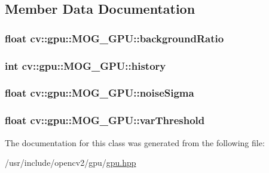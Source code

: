 \subsection{Member Data Documentation}
\hypertarget{classcv_1_1gpu_1_1MOG__GPU_ab19166eef3431fed0abb108a3718db19}{
\subsubsection[{background\-Ratio}]{\setlength{\rightskip}{0pt plus 5cm}float cv\-::gpu\-::\-M\-O\-G\-\_\-\-G\-P\-U\-::background\-Ratio}}\label{classcv_1_1gpu_1_1MOG__GPU_ab19166eef3431fed0abb108a3718db19}
\hypertarget{classcv_1_1gpu_1_1MOG__GPU_a73ca55f7883c8411201ff0230d9aa6fb}{
\subsubsection[{history}]{\setlength{\rightskip}{0pt plus 5cm}int cv\-::gpu\-::\-M\-O\-G\-\_\-\-G\-P\-U\-::history}}\label{classcv_1_1gpu_1_1MOG__GPU_a73ca55f7883c8411201ff0230d9aa6fb}
\hypertarget{classcv_1_1gpu_1_1MOG__GPU_a9b7ae4e418ff449890e290bd44f0d858}{
\subsubsection[{noise\-Sigma}]{\setlength{\rightskip}{0pt plus 5cm}float cv\-::gpu\-::\-M\-O\-G\-\_\-\-G\-P\-U\-::noise\-Sigma}}\label{classcv_1_1gpu_1_1MOG__GPU_a9b7ae4e418ff449890e290bd44f0d858}
\hypertarget{classcv_1_1gpu_1_1MOG__GPU_a65fd382117fb5965c920875dd3426ae6}{
\subsubsection[{var\-Threshold}]{\setlength{\rightskip}{0pt plus 5cm}float cv\-::gpu\-::\-M\-O\-G\-\_\-\-G\-P\-U\-::var\-Threshold}}\label{classcv_1_1gpu_1_1MOG__GPU_a65fd382117fb5965c920875dd3426ae6}


The documentation for this class was generated from the following file\-:\begin{DoxyCompactItemize}
\item 
/usr/include/opencv2/gpu/\hyperlink{gpu_2gpu_8hpp}{gpu.\-hpp}\end{DoxyCompactItemize}
